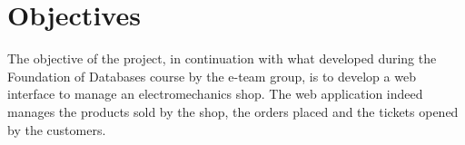 \section{Objectives}


The objective of the project, in continuation with what developed during the Foundation of
Databases course by the e-team group, is to develop a web interface to manage an electromechanics shop. The web application indeed manages the products sold by the shop, the orders placed and the tickets opened by the customers.